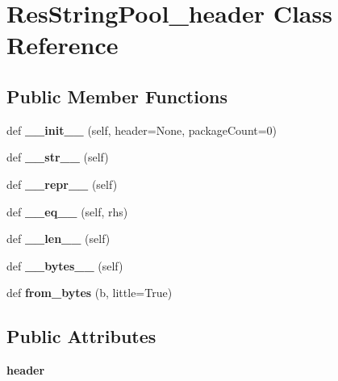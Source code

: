 \hypertarget{class_1_1ResStringPool__header}{}\section{Res\+String\+Pool\+\_\+header Class Reference}
\label{class_1_1ResStringPool__header}
\subsection*{Public Member Functions}
\begin{DoxyCompactItemize}
\item 
\mbox{\label{class_1_1ResStringPool__header_ae1ffaecb3c94af9346e8171b46c1d42b}} 
def {\bfseries \+\_\+\+\_\+init\+\_\+\+\_\+} (self, header=None, package\+Count=0)
\item 
\mbox{\label{class_1_1ResStringPool__header_a253ba87656f8314752d12e8ab83c8189}} 
def {\bfseries \+\_\+\+\_\+str\+\_\+\+\_\+} (self)
\item 
\mbox{\label{class_1_1ResStringPool__header_a1aca16bd4b24f05c3f9f740ee5553a4b}} 
def {\bfseries \+\_\+\+\_\+repr\+\_\+\+\_\+} (self)
\item 
\mbox{\label{class_1_1ResStringPool__header_a4687f4c22f751110f42e63b6601114b4}} 
def {\bfseries \+\_\+\+\_\+eq\+\_\+\+\_\+} (self, rhs)
\item 
\mbox{\label{class_1_1ResStringPool__header_ad4eb3f2f183cebebf10c16fc92caa68e}} 
def {\bfseries \+\_\+\+\_\+len\+\_\+\+\_\+} (self)
\item 
\mbox{\label{class_1_1ResStringPool__header_ad538a35af49258e7305a40217d4f069b}} 
def {\bfseries \+\_\+\+\_\+bytes\+\_\+\+\_\+} (self)
\item 
\mbox{\label{class_1_1ResStringPool__header_ae07aea196950d47abb1c67d9eaa3150b}} 
def {\bfseries from\+\_\+bytes} (b, little=True)
\end{DoxyCompactItemize}
\subsection*{Public Attributes}
\begin{DoxyCompactItemize}
\item 
\mbox{\label{class_1_1ResStringPool__header_ac814ce320cc538106cf3c8ee25949c70}} 
{\bfseries header}
\end{DoxyCompactItemize}
